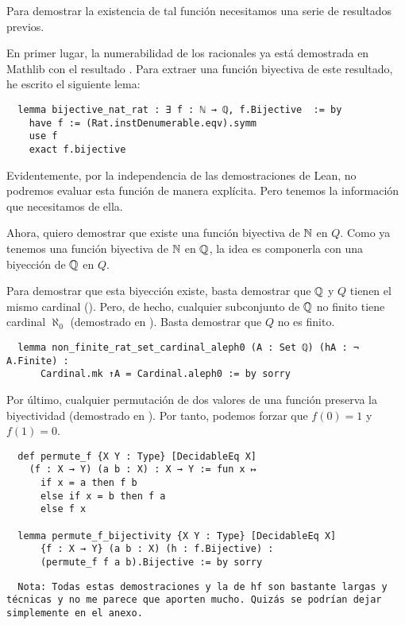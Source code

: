 Para demostrar la existencia de tal función necesitamos una serie de resultados previos.

En primer lugar, la numerabilidad de los racionales ya está demostrada en Mathlib con el resultado . Para extraer una función biyectiva de este resultado, he escrito el siguiente lema:

\begin{lstlisting}
  lemma bijective_nat_rat : ∃ f : ℕ → ℚ, f.Bijective  := by
    have f := (Rat.instDenumerable.eqv).symm
    use f
    exact f.bijective
\end{lstlisting}

Evidentemente, por la independencia de las demostraciones de Lean, no podremos evaluar esta función de manera explícita. Pero tenemos la información que necesitamos de ella.

Ahora, quiero demostrar que existe una función biyectiva de $\mathbb{N}$ en $Q$. Como ya tenemos una función biyectiva de $\mathbb{N}$ en $\mathbb{Q}$, la idea es componerla con una biyección de $\mathbb{Q}$ en $Q$.

Para demostrar que esta biyección existe, basta demostrar que $\mathbb{Q}$ y $Q$ tienen el mismo cardinal (). Pero, de hecho, cualquier subconjunto de $\mathbb{Q}$ no finito tiene cardinal $\aleph_0$ (demostrado en ). Basta demostrar que $Q$ no es finito.

\begin{lstlisting}
  lemma non_finite_rat_set_cardinal_aleph0 (A : Set ℚ) (hA : ¬ A.Finite) :
      Cardinal.mk ↑A = Cardinal.aleph0 := by sorry
\end{lstlisting}

Por último, cualquier permutación de dos valores de una función preserva la biyectividad (demostrado en ). Por tanto, podemos forzar que $f(0) = 1$ y $f(1) = 0$.

\begin{lstlisting}
  def permute_f {X Y : Type} [DecidableEq X]
    (f : X → Y) (a b : X) : X → Y := fun x ↦
      if x = a then f b
      else if x = b then f a
      else f x

  lemma permute_f_bijectivity {X Y : Type} [DecidableEq X]
      {f : X → Y} (a b : X) (h : f.Bijective) :
      (permute_f f a b).Bijective := by sorry
\end{lstlisting}

\begin{lstlisting}
  Nota: Todas estas demostraciones y la de hf son bastante largas y técnicas y no me parece que aporten mucho. Quizás se podrían dejar simplemente en el anexo.
\end{lstlisting}

